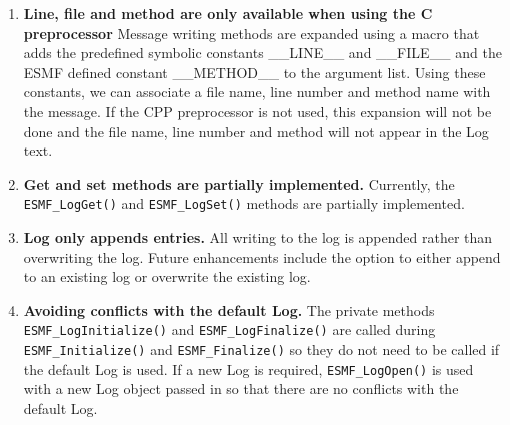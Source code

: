 %

\begin{enumerate}

\item {\bf Line, file and method are only available when using the C 
preprocessor}
Message writing methods are expanded using a macro that adds the predefined 
symbolic constants \_\_LINE\_\_ and \_\_FILE\_\_ and the ESMF defined constant
\_\_METHOD\_\_ to the argument list.  Using these constants, we can associate 
a file name, line number and method name with the message.  If the CPP 
preprocessor is not used, this expansion will not be done and the file name,
line number and method will not appear in the Log text.

\item{\bf Get and set methods are partially implemented.}
Currently, the {\tt ESMF\_LogGet()} and {\tt ESMF\_LogSet()} methods are 
partially implemented.   

\item{\bf Log only appends entries.}
All writing to the log is appended rather than overwriting the log.  Future 
enhancements include the option to either append to an existing log or 
overwrite the existing log.

\item{\bf Avoiding conflicts with the default Log.}
The private methods {\tt ESMF\_LogInitialize()} and {\tt ESMF\_LogFinalize()} 
are called during {\tt ESMF\_Initialize()} and {\tt ESMF\_Finalize()} so they
do not need to be called if the default Log is used.  If a new Log is required,
{\tt ESMF\_LogOpen()} is used with a new Log object passed in so that there 
are no conflicts with the default Log.

\end{enumerate}

